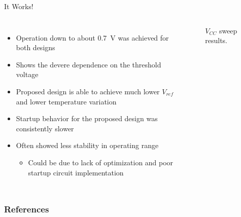 \documentclass[aspectratio=1610]{beamer} %
\begin{document}
\begin{frame}{It Works!}{}

    \begin{columns}[c]
        \begin{itemize}
            \item Operation down to about \qty{0.7}{\V} was achieved for both designs
            \item Shows the devere dependence on the threshold voltage
            \item Proposed design is able to achieve much lower \(V_{ref}\) and lower temperature variation
            \item Startup behavior for the proposed design was consistently slower
            \item Often showed less stability in operating range
            \begin{itemize}
                \item Could be due to lack of optimization and poor startup circuit implementation
            \end{itemize}
        \end{itemize}

        \begin{figure}[!t]
            \centering
            \datatable
            \vspace{-6pt}
            \caption{\(V_{CC}\) sweep results.}\label{fig:gpdk_bandgap_results}
        \end{figure}
    \end{columns}
\end{frame}

\begin{frame}[allowframebreaks]
    \frametitle{References}
    \small
    
    
    \small
\end{frame}
\end{document}

